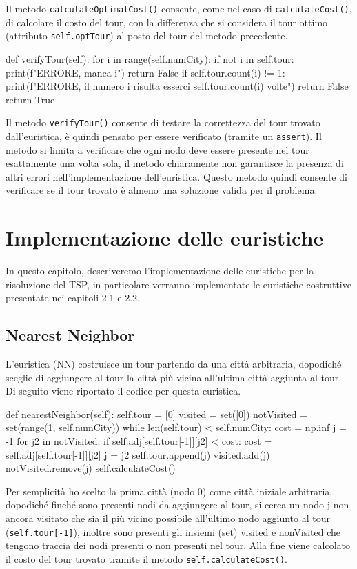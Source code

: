 \documentclass[a4paper,12pt]{report}
\begin{document}
Il metodo \lstinline!calculateOptimalCost()! consente, come nel caso di \lstinline!calculateCost()!, di calcolare il costo del tour, con la differenza che si considera il tour ottimo (attributo \lstinline!self.optTour!) al posto del tour del metodo precedente.
\begin{python}
def verifyTour(self):
  for i in range(self.numCity):
    if not i in self.tour:
      print(f"ERRORE, manca {i}")
      return False
    if self.tour.count(i) != 1:
      print(f"ERRORE, il numero {i} risulta esserci {self.tour.count(i)} volte")
      return False
  return True
\end{python}
Il metodo \lstinline!verifyTour()! consente di testare la correttezza del tour trovato dall'euristica, è quindi pensato per essere verificato (tramite un \lstinline!assert!). Il metodo si limita a verificare che ogni nodo deve essere presente nel tour esattamente una volta sola, il metodo chiaramente non garantisce la presenza di altri errori nell'implementazione dell'euristica. Questo metodo quindi consente di verificare se il tour trovato è almeno una soluzione valida per il problema.

\section{Implementazione delle euristiche}
In questo capitolo, descriveremo l'implementazione delle euristiche per la risoluzione del TSP, in particolare verranno implementate le euristiche costruttive presentate nei capitoli 2.1 e 2.2.
\subsection{Nearest Neighbor}
L'euristica  (NN) costruisce un tour partendo da una città arbitraria, dopodiché sceglie di aggiungere al tour la città più vicina all'ultima città aggiunta al tour. Di seguito viene riportato il codice per questa euristica.
\begin{python}
def nearestNeighbor(self):
  self.tour = [0]
  visited = set([0])
  notVisited = set(range(1, self.numCity))
  while len(self.tour) < self.numCity:
    cost = np.inf
    j = -1
    for j2 in notVisited:
      if self.adj[self.tour[-1]][j2] < cost:
        cost = self.adj[self.tour[-1]][j2]
        j = j2
    self.tour.append(j)
    visited.add(j)
    notVisited.remove(j)
  self.calculateCost()
\end{python}
Per semplicità ho scelto la prima città (nodo 0) come città iniziale arbitraria, dopodiché finché sono presenti nodi da aggiungere al tour, si cerca un nodo j non ancora visitato che sia il più vicino possibile all'ultimo nodo aggiunto al tour (\lstinline!self.tour[-1]!), inoltre sono presenti gli insiemi (set) visited e nonVisited che tengono traccia dei nodi presenti o non presenti nel tour. Alla fine viene calcolato il costo del tour trovato tramite il metodo \lstinline!self.calculateCost()!.
\end{document}
